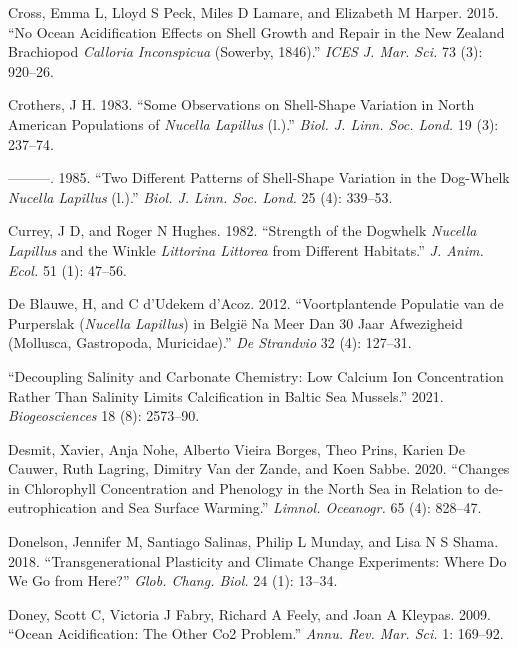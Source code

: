 \documentclass[smallextended]{svjour3}       %
\newlength{\cslhangindent}
\newenvironment{CSLReferences}[2] %
 {%
  \setlength{\parindent}{0pt}
  \ifodd #1 \everypar{\setlength{\hangindent}{\cslhangindent}}\ignorespaces\fi
  \ifnum #2 > 0
  \setlength{\parskip}{#2\baselineskip}
  \fi
 }%
 {}
\begin{document}
\begin{CSLReferences}{1}{0}
\leavevmode{}%
Cross, Emma L, Lloyd S Peck, Miles D Lamare, and Elizabeth M Harper.
2015. {``No Ocean Acidification Effects on Shell Growth and Repair in
the New Zealand Brachiopod \emph{Calloria Inconspicua} (Sowerby,
1846).''} \emph{ICES J. Mar. Sci.} 73 (3): 920--26.

\leavevmode{}%
Crothers, J H. 1983. {``Some Observations on Shell-Shape Variation in
North American Populations of \emph{Nucella Lapillus} (l.).''}
\emph{Biol. J. Linn. Soc. Lond.} 19 (3): 237--74.

\leavevmode{}%
---------. 1985. {``Two Different Patterns of Shell-Shape Variation in
the Dog-Whelk \emph{Nucella Lapillus} (l.).''} \emph{Biol. J. Linn. Soc.
Lond.} 25 (4): 339--53.

\leavevmode{}%
Currey, J D, and Roger N Hughes. 1982. {``Strength of the Dogwhelk
\emph{Nucella Lapillus} and the Winkle \emph{Littorina Littorea} from
Different Habitats.''} \emph{J. Anim. Ecol.} 51 (1): 47--56.

\leavevmode{}%
De Blauwe, H, and C d'Udekem d'Acoz. 2012. {``Voortplantende Populatie
van de Purperslak (\emph{Nucella Lapillus}) in Belgi{ë} Na Meer Dan 30
Jaar Afwezigheid (Mollusca, Gastropoda, Muricidae).''} \emph{De
Strandvio} 32 (4): 127--31.

\leavevmode{}%
{``Decoupling Salinity and Carbonate Chemistry: Low Calcium Ion
Concentration Rather Than Salinity Limits Calcification in Baltic Sea
Mussels.''} 2021. \emph{Biogeosciences} 18 (8): 2573--90.

\leavevmode{}%
Desmit, Xavier, Anja Nohe, Alberto Vieira Borges, Theo Prins, Karien De
Cauwer, Ruth Lagring, Dimitry Van der Zande, and Koen Sabbe. 2020.
{``Changes in Chlorophyll Concentration and Phenology in the North Sea
in Relation to de‐eutrophication and Sea Surface Warming.''}
\emph{Limnol. Oceanogr.} 65 (4): 828--47.

\leavevmode{}%
Donelson, Jennifer M, Santiago Salinas, Philip L Munday, and Lisa N S
Shama. 2018. {``Transgenerational Plasticity and Climate Change
Experiments: Where Do We Go from Here?''} \emph{Glob. Chang. Biol.} 24
(1): 13--34.

\leavevmode{}%
Doney, Scott C, Victoria J Fabry, Richard A Feely, and Joan A Kleypas.
2009. {``Ocean Acidification: The Other Co2 Problem.''} \emph{Annu. Rev.
Mar. Sci.} 1: 169--92.


\end{CSLReferences}
\end{document}
